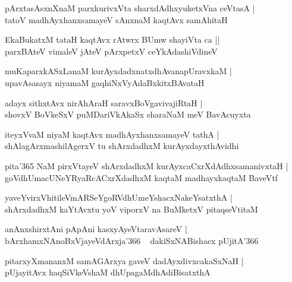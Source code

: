 \documentclass[twoside,12pt,openright]{book}
\newcounter{shloka}[chapter]
\begin{document}
\begin{shloka}%
pArxtasAsxnXnaM parxkurivxVta sharxdAdhxyuketxVna ceVtasA |\\
tatoV madhAyxhanxsamayeV sAnxnaM kaqtAvx samAhitaH 
\end{shloka}

\begin{shloka}%
EkaBukatxM tataH kaqtAvx rAtwrx BUmw shayiVta ca ||\\
parxBAteV vimaleV jAteV pArxpetxV ceYkAdashiVdineV 
\end{shloka}

\begin{shloka}%
muKaparxkASxLanaM kurAyxdadxnatxdhAvanapUravxkaM |\\
upavAsasayx niyamaM gaqhiNxVyAdaBxkitxBAvataH 
\end{shloka}

\begin{shloka}%
adayx sithxtAvx nirAhAraH saravxBoVgavivajiRtaH |\\
shovxV BoVkeSxV puMDariVkAkaSx sharaNaM meV BavAcuyxta
\end{shloka}

\begin{shloka}%
iteyxVvaM niyaM kaqtAvx madhAyxhanxsamayeV tathA |\\
shAlagArxmashilAgerxV tu shArxdadhxM kurAyxdayxthAvidhi
\end{shloka}

\begin{shloka}%
pita\char'365 NaM pirxVtayeV shArxdadhxM kurAyxcaCxrXdAdhxsamanivxtaH |\\
goVdhUmacUNeYRyaRcACxrXdadhxM kaqtaM madhayxkaqtaM BaveVtf 
\end{shloka}

\begin{shloka}%
yaveYvirxVhitileVmARSeYgoRVdhUmeYshacxNakeYsatxthA |\\
shArxdadhxM kaYtAvxtu yoV viporxV na BuMketxV pitaqseVtitaM 
\end{shloka}

\begin{shloka}%
anAnxshirxtAni pApAni kasxyAyeVtaravAsareV |\\
bArxhamxNAnoBxVjayeVdArxja\char'366 ~ dakiSxNABishacx pUjitA\char'366
\end{shloka}

\begin{shloka}%
pitarxyXmananxM samAGArxya gaveV dadAyxdivxcakaSxNaH |\\
pUjayitAvx haqSiVkeVshaM dhUpagaMdhAdiBisatxthA 
\end{shloka}
\end{document}
